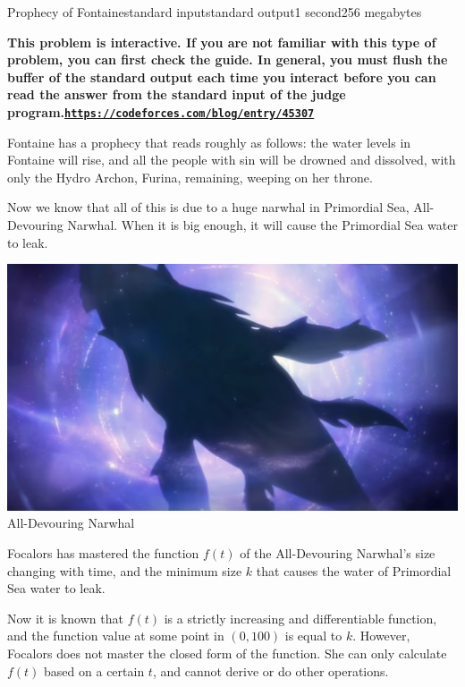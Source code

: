 \begin{problem}{Prophecy of Fontaine}{standard input}{standard output}{1 second}{256 megabytes}

\providecommand{\url}[1]{\underline{\texttt{#1}}}

\textbf {This problem is interactive. If you are not familiar with this type of problem, you can first check the guide. In general, you must flush the buffer of the standard output each time you interact before you can read the answer from the standard input of the judge program.\url{https://codeforces.com/blog/entry/45307}}

Fontaine has a prophecy that reads roughly as follows: the water levels in Fontaine will rise, and all the people with sin will be drowned and dissolved, with only the Hydro Archon, Furina, remaining, weeping on her throne.

Now we know that all of this is due to a huge narwhal in Primordial Sea, All-Devouring Narwhal. When it is big enough, it will cause the Primordial Sea water to leak.

\begin{center}
  \includegraphics[scale=0.4]{whale.jpg} \\
  \small{All-Devouring Narwhal}
\end{center}

Focalors has mastered the function $f(t)$ of the All-Devouring Narwhal's size changing with time, and the minimum size $k$ that causes the water of Primordial Sea water to leak.

Now it is known that $f(t)$ is a strictly increasing and differentiable function, and the function value at some point in $(0, 100)$ is equal to $k$. However, Focalors does not master the closed form of the function. She can only calculate $f(t)$ based on a certain $t$, and cannot derive or do other operations.


\end{problem}
